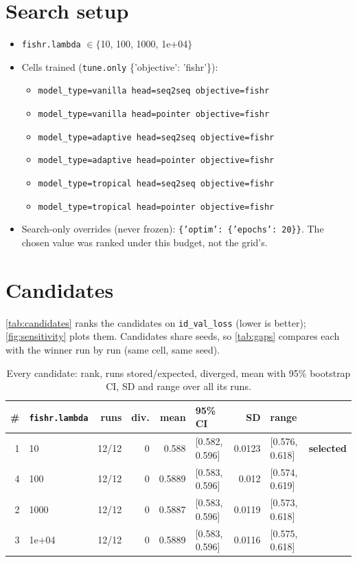 \documentclass[10pt]{article}
\begin{document}
\section{Search setup}
\begin{itemize}\setlength\itemsep{0pt}
\item \texttt{fishr.lambda} $\in \{$10, 100, 1000, 1e+04$\}$
\item Cells trained (\texttt{tune.only} \{'objective': 'fishr'\}):
\begin{itemize}\setlength\itemsep{0pt}
\item \texttt{model\_type=vanilla head=seq2seq objective=fishr}
\item \texttt{model\_type=vanilla head=pointer objective=fishr}
\item \texttt{model\_type=adaptive head=seq2seq objective=fishr}
\item \texttt{model\_type=adaptive head=pointer objective=fishr}
\item \texttt{model\_type=tropical head=seq2seq objective=fishr}
\item \texttt{model\_type=tropical head=pointer objective=fishr}
\end{itemize}
\item Search-only overrides (never frozen): \texttt{\{'optim': \{'epochs': 20\}\}}. The chosen value was ranked under this budget, not the grid's.
\end{itemize}

\section{Candidates}
\autoref{tab:candidates} ranks the candidates on \texttt{id\_val\_loss} (lower is better); \autoref{fig:sensitivity} plots them.
Candidates share seeds, so \autoref{tab:gaps} compares each with the winner run by run (same cell, same seed).

{\small
\begin{longtable}{rlrrrlrll}
\caption{Every candidate: rank, runs stored/expected, diverged, mean with 95\% bootstrap CI, SD and range over all its runs.}\label{tab:candidates}\\
\toprule
\# & \texttt{fishr.lambda} & runs & div. & mean & 95\% CI & SD & range & \\
\midrule
\endhead
1 & 10 & 12/12 & 0 & 0.588 & [0.582, 0.596] & 0.0123 & [0.576, 0.618] & \textbf{selected}\\
4 & 100 & 12/12 & 0 & 0.5889 & [0.583, 0.596] & 0.012 & [0.574, 0.619] & \\
2 & 1000 & 12/12 & 0 & 0.5887 & [0.583, 0.596] & 0.0119 & [0.573, 0.618] & \\
3 & 1e+04 & 12/12 & 0 & 0.5889 & [0.583, 0.596] & 0.0116 & [0.575, 0.618] & \\
\bottomrule
\end{longtable}
}
\end{document}
